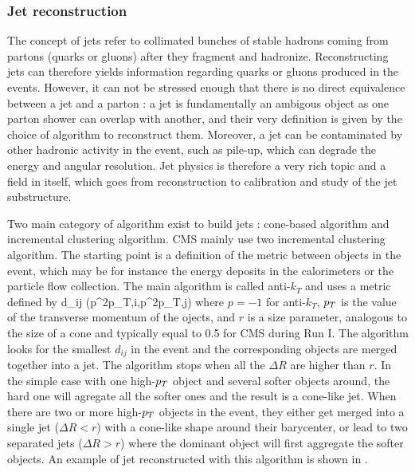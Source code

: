 
        \subsubsection{Jet reconstruction \label{sec:jetReconstruction}}

        The concept of jets refer to collimated bunches of stable hadrons coming from partons
        (quarks or gluons) after they fragment and hadronize. Reconstructing jets can
        therefore yields information regarding quarks or gluons produced in the events.
        However, it can not be stressed enough that there is no direct equivalence between
        a jet and a parton : a jet is fundamentally an ambigous object as one parton
        shower can overlap with another, and their very definition is given by the choice
        of algorithm to reconstruct them. Moreover, a jet can be contaminated by other
        hadronic activity in the event, such as pile-up, which can degrade the energy
        and angular resolution. Jet physics is therefore a very rich topic and a field
        in itself, which goes from reconstruction to calibration and study of the jet
        substructure.

        Two main category of algorithm exist to build jets : cone-based algorithm and
        incremental clustering algorithm. CMS mainly use two incremental clustering
        algorithm. The starting point is a definition of the metric between objects in the
        event, which may be for instance the energy deposits in the calorimeters or the
        particle flow collection. The main algorithm is called anti-$k_T$ and uses a metric
        defined by
        {
            d_{ij}  {}(p^{2p}_{T,i},p^{2p}_{T,j}) 
        }
        where $p = -1$ for anti-$k_T$, $p_T$ is the value of the transverse momentum of
        the ojects, and $r$ is a size parameter, analogous to the size of a cone and
        typically equal to 0.5 for CMS during Run I. The algorithm looks for the smallest
        $d_{ij}$ in the event and the corresponding objects are merged together into a
        jet. The algorithm stops when all the $\Delta R$ are higher than $r$. In the
        simple case with one high-$p_T$ object and several softer objects around, the
        hard one will agregate all the softer ones and the result is a cone-like jet. When
        there are two or more high-$p_T$ objects in the event, they either get merged into
        a single jet ($\Delta R < r$) with a cone-like shape around their barycenter, or
        lead to two separated jets ($\Delta R > r$) where the dominant object will first
        aggregate the softer objects. An example of jet reconstructed with this algorithm
        is shown in .

